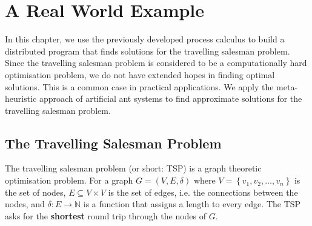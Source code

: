 \nomenclature[500]{\hfill}{}

\nomenclature[510]{\hfill}{}


\chapter{A Real World Example}
\vspace*{-0.5em}
In this chapter, we use the previously developed process calculus to build a distributed program that finds solutions for the travelling salesman problem. Since the travelling salesman problem is considered to be a computationally hard optimisation problem, we do not have extended hopes in finding optimal solutions. This is a common case in practical applications. We apply the meta-heuristic approach of artificial ant systems to find approximate solutions for the travelling salesman problem.

\section{The Travelling Salesman Problem}
\label{chp:tsp}
\vspace*{-0.5em}
The travelling salesman problem (or short: \textsc{TSP}) is a graph theoretic optimisation problem. For a graph $G = \left( V, E, \delta \right)$ where $V = \left\{ v_1, v_2, \ldots, v_n \right\}$ is the set of nodes, $E \subseteq V \times V$ is the set of edges, i.e. the connections between the nodes, and $\delta \colon E \to \mathbb{N}$ is a function that assigns a length to every edge. The \textsc{TSP} asks for the \textbf{shortest} round trip through the nodes of $G$.


